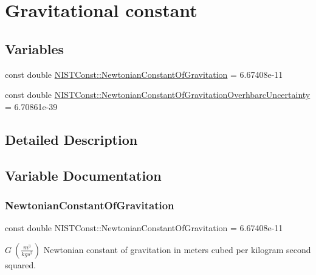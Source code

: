 \hypertarget{group___gravitational_constant}{}\section{Gravitational constant}
\label{group___gravitational_constant}
\subsection*{Variables}
\begin{DoxyCompactItemize}
\item 
const double \hyperlink{group___gravitational_constant_gaba6371307f4cebde50b3c61a07c724c5}{N\+I\+S\+T\+Const\+::\+Newtonian\+Constant\+Of\+Gravitation} = 6.\+67408e-\/11
\item 
const double \hyperlink{group___gravitational_constant_gaf10cbbd8ad1ece4ec01e35fe3d86854f}{N\+I\+S\+T\+Const\+::\+Newtonian\+Constant\+Of\+Gravitation\+Overhbarc\+Uncertainty} = 6.\+70861e-\/39
\end{DoxyCompactItemize}


\subsection{Detailed Description}


\subsection{Variable Documentation}
\mbox{\label{group___gravitational_constant_gaba6371307f4cebde50b3c61a07c724c5}} 
\subsubsection{\texorpdfstring{Newtonian\+Constant\+Of\+Gravitation}{NewtonianConstantOfGravitation}}
{\footnotesize\ttfamily const double N\+I\+S\+T\+Const\+::\+Newtonian\+Constant\+Of\+Gravitation = 6.\+67408e-\/11}

$G \ (\frac{m^3}{kg s^2})$ Newtonian constant of gravitation in meters cubed per kilogram second squared. \mbox{\label{group___gravitational_constant_gaf10cbbd8ad1ece4ec01e35fe3d86854f}} 

